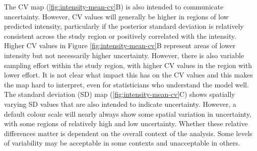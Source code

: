 \documentclass{statsoc}
\begin{document}
The CV map (\autoref{fig:intensity-mean-cv}B) is also intended to communicate uncertainty.  However, CV values will generally be higher in regions of low predicted intensity, particularly if the posterior standard deviation is relatively consistent across the study region or positively correlated with the intensity.  Higher CV values in Figure \ref{fig:intensity-mean-cv}B represent areas of lower intensity but not necessarily higher uncertainty.  However, there is also variable sampling effort within the study region, with higher CV values in the region with lower effort.  It is not clear what impact this has on the CV values and this makes the map hard to interpret, even for statisticians who understand the model well. The standard deviation (SD) map (\autoref{fig:intensity-mean-cv}C) shows spatially varying SD values that are also intended to indicate uncertainty.  However, a default colour scale will nearly always show some spatial variation in uncertainty, with some regions of relatively high and low uncertainty.  Whether these relative differences matter is dependent on the overall context of the analysis.  Some levels of variability may be acceptable in some contexts and unacceptable in others.  
\end{document}
